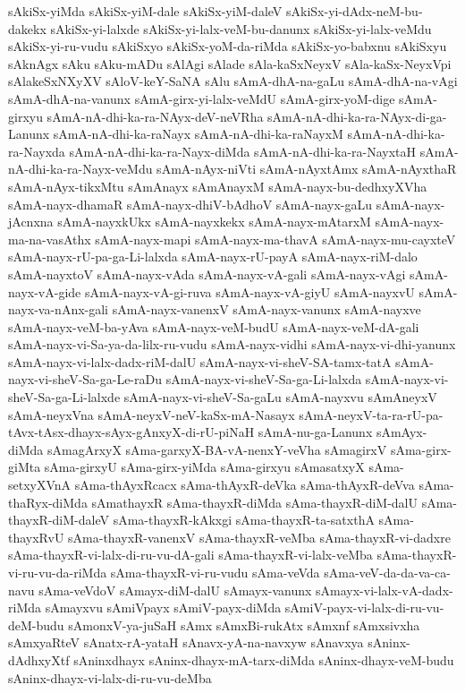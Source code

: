 {sAkiSx-yiMda
sAkiSx-yiM-dale
sAkiSx-yiM-daleV
sAkiSx-yi-dAdx-neM-bu-dakekx
sAkiSx-yi-lalxde
sAkiSx-yi-lalx-veM-bu-danunx
sAkiSx-yi-lalx-veMdu
sAkiSx-yi-ru-vudu
sAkiSxyo
sAkiSx-yoM-da-riMda
sAkiSx-yo-babxnu
sAkiSxyu
sAknAgx
sAku
sAku-mADu
sAlAgi
sAlade
sAla-kaSxNeyxV
sAla-kaSx-NeyxVpi
sAlakeSxNXyXV
sAloV-keY-SaNA
sAlu
sAmA-dhA-na-gaLu
sAmA-dhA-na-vAgi
sAmA-dhA-na-vanunx
sAmA-girx-yi-lalx-veMdU
sAmA-girx-yoM-dige
sAmA-girxyu
sAmA-nA-dhi-ka-ra-NAyx-deV-neVRha
sAmA-nA-dhi-ka-ra-NAyx-di-ga-Lanunx
sAmA-nA-dhi-ka-raNayx
sAmA-nA-dhi-ka-raNayxM
sAmA-nA-dhi-ka-ra-Nayxda
sAmA-nA-dhi-ka-ra-Nayx-diMda
sAmA-nA-dhi-ka-ra-NayxtaH
sAmA-nA-dhi-ka-ra-Nayx-veMdu
sAmA-nAyx-niVti
sAmA-nAyxtAmx
sAmA-nAyxthaR
sAmA-nAyx-tikxMtu
sAmAnayx
sAmAnayxM
sAmA-nayx-bu-dedhxyXVha
sAmA-nayx-dhamaR
sAmA-nayx-dhiV-bAdhoV
sAmA-nayx-gaLu
sAmA-nayx-jAcnxna
sAmA-nayxkUkx
sAmA-nayxkekx
sAmA-nayx-mAtarxM
sAmA-nayx-ma-na-vasAthx
sAmA-nayx-mapi
sAmA-nayx-ma-thavA
sAmA-nayx-mu-cayxteV
sAmA-nayx-rU-pa-ga-Li-lalxda
sAmA-nayx-rU-payA
sAmA-nayx-riM-dalo
sAmA-nayxtoV
sAmA-nayx-vAda
sAmA-nayx-vA-gali
sAmA-nayx-vAgi
sAmA-nayx-vA-gide
sAmA-nayx-vA-gi-ruva
sAmA-nayx-vA-giyU
sAmA-nayxvU
sAmA-nayx-va-nAnx-gali
sAmA-nayx-vanenxV
sAmA-nayx-vanunx
sAmA-nayxve
sAmA-nayx-veM-ba-yAva
sAmA-nayx-veM-budU
sAmA-nayx-veM-dA-gali
sAmA-nayx-vi-Sa-ya-da-lilx-ru-vudu
sAmA-nayx-vidhi
sAmA-nayx-vi-dhi-yanunx
sAmA-nayx-vi-lalx-dadx-riM-dalU
sAmA-nayx-vi-sheV-SA-tamx-tatA
sAmA-nayx-vi-sheV-Sa-ga-Le-raDu
sAmA-nayx-vi-sheV-Sa-ga-Li-lalxda
sAmA-nayx-vi-sheV-Sa-ga-Li-lalxde
sAmA-nayx-vi-sheV-Sa-gaLu
sAmA-nayxvu
sAmAneyxV
sAmA-neyxVna
sAmA-neyxV-neV-kaSx-mA-Nasayx
sAmA-neyxV-ta-ra-rU-pa-tAvx-tAsx-dhayx-sAyx-gAnxyX-di-rU-piNaH
sAmA-nu-ga-Lanunx
sAmAyx-diMda
sAmagArxyX
sAma-garxyX-BA-vA-nenxY-veVha
sAmagirxV
sAma-girx-giMta
sAma-girxyU
sAma-girx-yiMda
sAma-girxyu
sAmasatxyX
sAma-setxyXVnA
sAma-thAyxRcacx
sAma-thAyxR-deVka
sAma-thAyxR-deVva
sAma-thaRyx-diMda
sAmathayxR
sAma-thayxR-diMda
sAma-thayxR-diM-dalU
sAma-thayxR-diM-daleV
sAma-thayxR-kAkxgi
sAma-thayxR-ta-satxthA
sAma-thayxRvU
sAma-thayxR-vanenxV
sAma-thayxR-veMba
sAma-thayxR-vi-dadxre
sAma-thayxR-vi-lalx-di-ru-vu-dA-gali
sAma-thayxR-vi-lalx-veMba
sAma-thayxR-vi-ru-vu-da-riMda
sAma-thayxR-vi-ru-vudu
sAma-veVda
sAma-veV-da-da-va-ca-navu
sAma-veVdoV
sAmayx-diM-dalU
sAmayx-vanunx
sAmayx-vi-lalx-vA-dadx-riMda
sAmayxvu
sAmiVpayx
sAmiV-payx-diMda
sAmiV-payx-vi-lalx-di-ru-vu-deM-budu
sAmonxV-ya-juSaH
sAmx
sAmxBi-rukAtx
sAmxnf
sAmxsivxha
sAmxyaRteV
sAnatx-rA-yataH
sAnavx-yA-na-navxyw
sAnavxya
sAninx-dAdhxyXtf
sAninxdhayx
sAninx-dhayx-mA-tarx-diMda
sAninx-dhayx-veM-budu
sAninx-dhayx-vi-lalx-di-ru-vu-deMba
}
